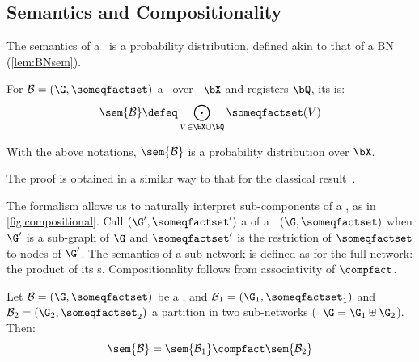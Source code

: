 \subsection{Semantics and Compositionality}

The semantics of a \qqbn\ is a probability distribution, defined akin to that of a BN (\cref{lem:BNsem}).

\begin{definition}
For $\mathcal{B} = (\G,\someqfactset)$ a \qqbn\ over \rvs\ $\bX$ and registers $\bQ$, its  is:
\begin{equation*}
\sem{\mathcal{B}} \defeq \bigodot_{V \in \bX\cup\bQ} \someqfactset(V)
\end{equation*}
\end{definition}

\begin{proposition}
\label{lem:sem_qbn_dist}
With the above notations, $\sem{\mathcal{B}}$ is a probability distribution over $\bX$.
\end{proposition}
The proof is obtained in a similar way to that for the classical result~\cite{Pearl86}.

The formalism allows us to naturally interpret sub-components of a \qqbn, as in \cref{fig:compositional}.
Call $(\G',\someqfactset')$ a  of a \qqbn\ $(\G,\someqfactset)$ when $\G'$ is a sub-graph of $\G$ and $\someqfactset'$ is the restriction of $\someqfactset$ to nodes of $\G'$.
The semantics of a sub-network is defined as for the full network: the product of its \qfactor s.
Compositionality follows from associativity of $\compfact$.

\begin{proposition}[Compositionality]
\label{lem:compositionality_qbn}
Let $\mathcal{B} = (\G,\someqfactset)$ be a \qqbn, and $\mathcal{B}_1 = (\G_1,\someqfactset_1)$ and $\mathcal{B}_2 = (\G_2,\someqfactset_2)$ a partition in two sub-networks (\ie\ $\G = \G_1 \uplus \G_2$).
Then:
\begin{equation*}
\sem{\mathcal{B}} = \sem{\mathcal{B}_1} \compfact \sem{\mathcal{B}_2}
\end{equation*}
\end{proposition}


